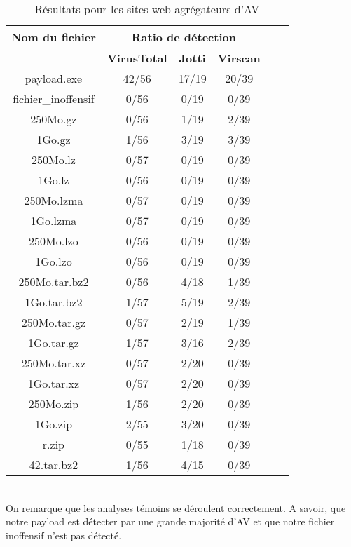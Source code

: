 \documentclass[smallextended]{svjour3}       %
\begin{document}
\begin{table}[ht!]
\begin{normalsize}
\begin{center}
\begin{tabular}{|*{6}{c|}}
    \hline
    \textbf{Nom du fichier} & \multicolumn{3}{|c|}{\textbf{Ratio de détection}}\\
    \hline
  	 & \textbf{VirusTotal} & \textbf{Jotti} & \textbf{Virscan} \\
	\hline
payload.exe & 42/56 & 17/19 & 20/39\\
	\hline
fichier\_inoffensif & 0/56 & 0/19  & 0/39 \\
	\hline
	\hline
250Mo.gz & 0/56 & 1/19 & 2/39 \\
	\hline
1Go.gz &  1/56 & 3/19 & 3/39\\
    \hline
    \hline
250Mo.lz & 0/57 & 0/19 & 0/39\\
	\hline
1Go.lz & 0/56 & 0/19 & 0/39\\
    \hline
    \hline
250Mo.lzma & 0/57 & 0/19 & 0/39\\
	\hline
1Go.lzma & 0/57 & 0/19 & 0/39\\
    \hline
    \hline
250Mo.lzo & 0/56 & 0/19 & 0/39\\
	\hline
1Go.lzo & 0/56 & 0/19 & 0/39\\
    \hline
    \hline
250Mo.tar.bz2 & 0/56 & 4/18 & 1/39\\
	\hline
1Go.tar.bz2 & 1/57 & 5/19 & 2/39\\
    \hline
    \hline
250Mo.tar.gz & 0/57 & 2/19 & 1/39\\
	\hline
1Go.tar.gz & 1/57 & 3/16 & 2/39\\
    \hline
    \hline
250Mo.tar.xz & 0/57 & 2/20 & 0/39\\
	\hline
1Go.tar.xz & 0/57 & 2/20 & 0/39\\
    \hline
    \hline
250Mo.zip & 1/56 & 2/20 & 0/39\\
	\hline
1Go.zip & 2/55 & 3/20 & 0/39\\
    \hline
    \hline
r.zip & 0/55 & 1/18 & 0/39\\
	\hline
42.tar.bz2 & 1/56 & 4/15 & 0/39\\
	\hline
\end{tabular}
\end{center}
\caption{Résultats pour les sites web agrégateurs d'AV}
\end{normalsize}
\end{table}
\\On remarque que les analyses témoins se déroulent correctement. A savoir, que notre payload est détecter par une grande majorité d'AV et que notre fichier inoffensif n'est pas détecté.\\
\end{document}
